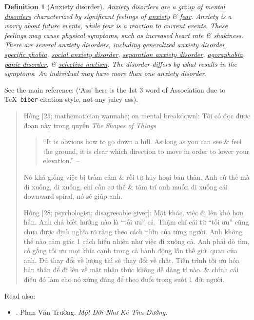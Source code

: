 \documentclass[12pt,oneside]{book}
\newtheorem{definition}{Definition}[section]
\begin{document}
\begin{definition}[Anxiety disorder]
	\emph{Anxiety disorders} are a group of \href{https://en.wikipedia.org/wiki/Mental_disorder}{mental disorders} characterized by significant feelings of \href{https://en.wikipedia.org/wiki/Anxiety_(mood)}{anxiety} \& \href{https://en.wikipedia.org/wiki/Fear}{fear}. Anxiety is a worry about future events, while fear is a reaction to current events. These feelings may cause physical symptoms, such as increased heart rate \& shakiness. There are several anxiety disorders, including \href{https://en.wikipedia.org/wiki/Generalized_anxiety_disorder}{generalized anxiety disorder}, \href{https://en.wikipedia.org/wiki/Specific_phobia}{specific phobia}, \href{https://en.wikipedia.org/wiki/Social_anxiety_disorder}{social anxiety disorder}, \href{https://en.wikipedia.org/wiki/Separation_anxiety_disorder}{separation anxiety disorder}, \href{https://en.wikipedia.org/wiki/Agoraphobia}{agoraphobia}, \href{https://en.wikipedia.org/wiki/Panic_disorder}{panic disorder}, \& \href{https://en.wikipedia.org/wiki/Selective_mutism}{selective mutism}. The disorder differs by what results in the symptoms. An individual may have more than one anxiety disorder.
\end{definition}
See the main reference: \cite{APA_DSM5} (`Ass' here is the 1st 3 word of Association due to \TeX\ {\tt biber} citation style, not any juicy ass).

\begin{quote}
	{\sf Hồng [25; mathematician wannabe; on mental breakdown]}: Tôi có đọc được đoạn này trong quyển {\it The Shapes of Things}
	\begin{quotation}
		``It is obvious how to go down a hill. As long as you can see \& feel the ground, it is clear which direction to move in order to lower your elevation.'' -- \cite[Sect. 1.2.3: {\it Sequentil Optimization of Shape, Which Way Is Down?}, p. 2]{Walker2015}
	\end{quotation}
	Nó khá giống việc bị trầm cảm \& rồi tự hủy hoại bản thân. Anh cứ thế mà đi xuống, đi xuống, chỉ cần cơ thể \& tâm trí anh muốn đi xuống cái downward spiral, nó sẽ giúp anh.
	
	{\sf Hồng [28; psychologist; disagreeable giver]}: Mặt khác, việc đi lên khó hơn hẳn. Anh chả biết hướng nào là ``tối ưu'' cả. Thậm chí cái từ ``tối ưu'' cũng chưa được định nghĩa rõ ràng theo cách nhìn của từng người. Anh không thể nào cảm giác 1 cách hiển nhiên như việc đi xuống cả. Anh phải dò tìm, cố gắng tối ưu mọi khía cạnh trong cả hành động lẫn thế giới quan của anh. Đủ thay đổi về lượng thì sẽ thay đổi về chất. Tiến trình tối ưu hóa bản thân để đi lên về mặt nhận thức không dễ dàng tí nào. \& chính cái điều đó làm cho nó xứng đáng để theo đuổi trong suốt 1 đời người.
\end{quote}
Read also:
\begin{itemize}
	\item \cite{Truong_ke_tim_duong}. {\sc Phan Văn Trường}. {\it Một Đời Như Kẻ Tìm Đường}.
\end{itemize}
\end{document}

